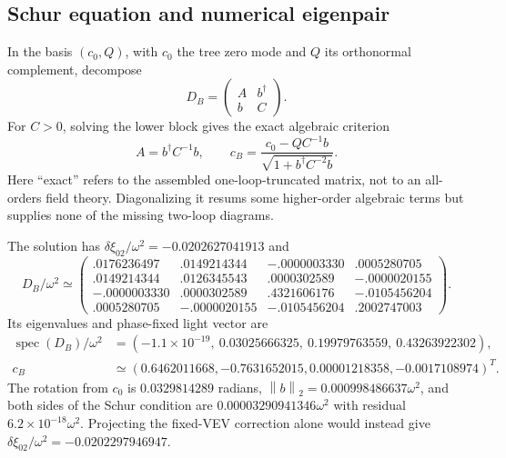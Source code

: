 \documentclass[11pt]{article}
\newcommand{\norm}[1]{\left\lVert#1\right\rVert_2}
\begin{document}
\subsection{Schur equation and numerical eigenpair}
In the basis $(c_0,Q)$, with $c_0$ the tree zero mode and $Q$ its
orthonormal complement, decompose
\begin{equation}
 D_B=\begin{pmatrix}A&b^\dagger\\b&C\end{pmatrix}.
\end{equation}
For $C>0$, solving the lower block gives the exact algebraic criterion
\begin{equation}
 \boxed{A=b^\dagger C^{-1}b,\qquad
 c_B=\frac{c_0-QC^{-1}b}{\sqrt{1+b^\dagger C^{-2}b}}.}
\label{eq:schur}
\end{equation}
Here ``exact'' refers to the assembled one-loop-truncated matrix, not to
an all-orders field theory. Diagonalizing it resums some higher-order
algebraic terms but supplies none of the missing two-loop diagrams.

The solution has $\delta\xi_{02}/\omega^2=-0.0202627041913$ and
\begin{equation}
 D_B/\omega^2\simeq\begin{pmatrix}
.0176236497&.0149214344&-.0000003330&.0005280705\\
.0149214344&.0126345543&.0000302589&-.0000020155\\
-.0000003330&.0000302589&.4321606176&-.0105456204\\
.0005280705&-.0000020155&-.0105456204&.2002747003
\end{pmatrix}.
\end{equation}
Its eigenvalues and phase-fixed light vector are
\begin{align}
 \operatorname{spec}(D_B)/\omega^2
 &=(-1.1\times10^{-19},\ 0.03025666325,\ 0.19979763559,\ 0.43263922302),\\
 c_B&\simeq(0.6462011668,-0.7631652015,
 0.00001218358,-0.0017108974)^T.
\end{align}
The rotation from $c_0$ is $0.0329814289$ radians,
$\norm{b}=0.000998486637\omega^2$, and both sides of the Schur condition
are $0.00003290941346\omega^2$ with residual
$6.2\times10^{-18}\omega^2$. Projecting the fixed-VEV correction alone
would instead give $\delta\xi_{02}/\omega^2=-0.0202297946947$.
\end{document}

